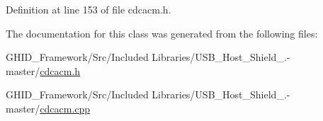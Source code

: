 \-Definition at line 153 of file cdcacm.\-h.



\-The documentation for this class was generated from the following files\-:\begin{DoxyCompactItemize}
\item 
\-G\-H\-I\-D\-\_\-\-Framework/\-Src/\-Included Libraries/\-U\-S\-B\-\_\-\-Host\-\_\-\-Shield\-\_.-\/master/\hyperlink{cdcacm_8h}{cdcacm.\-h}\item 
\-G\-H\-I\-D\-\_\-\-Framework/\-Src/\-Included Libraries/\-U\-S\-B\-\_\-\-Host\-\_\-\-Shield\-\_.-\/master/\hyperlink{cdcacm_8cpp}{cdcacm.\-cpp}\end{DoxyCompactItemize}
